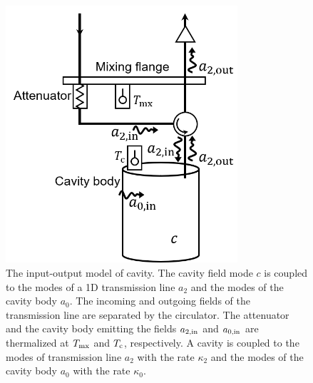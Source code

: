 \begin{figure}[htbp]
    \centering
    \includegraphics[width=8.6cm]{figures/inout.png}
    \caption{The input-output model of cavity. The cavity field mode $c$ is 
coupled to the modes of a 1D transmission line $a_2$ and the modes of the 
cavity body $a_0$. The incoming and outgoing fields of the transmission line 
are separated by the circulator. The attenuator and the cavity body emitting 
the fields $a_{2,\rm in}$ and $a_{0,\rm in}$ are thermalized at $T_{\rm mx}$ 
and $T_{\rm c}$, respectively. A cavity is coupled to the modes of 
transmission line $a_2$ with the rate $\kappa_2$ and the modes of the cavity 
body $a_0$ with the rate $\kappa_0$.}
    \label{fig:cavity_in_out}
\end{figure}



